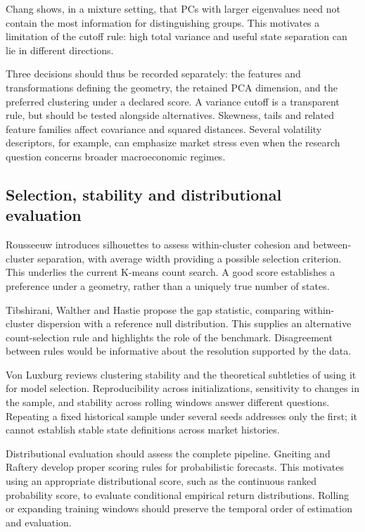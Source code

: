 \documentclass[11pt,a4paper]{article}
\begin{document}
Chang \cite{chang1983} shows, in a mixture setting, that PCs with larger eigenvalues need not contain the most information for distinguishing groups. This motivates a limitation of the cutoff rule: high total variance and useful state separation can lie in different directions.

Three decisions should thus be recorded separately: the features and transformations defining the geometry, the retained PCA dimension, and the preferred clustering under a declared score. A variance cutoff is a transparent rule, but should be tested alongside alternatives. Skewness, tails and related feature families affect covariance and squared distances. Several volatility descriptors, for example, can emphasize market stress even when the research question concerns broader macroeconomic regimes.

\subsection{Selection, stability and distributional evaluation}

Rousseeuw \cite{rousseeuw1987} introduces silhouettes to assess within-cluster cohesion and between-cluster separation, with average width providing a possible selection criterion. This underlies the current K-means count search. A good score establishes a preference under a geometry, rather than a uniquely true number of states.

Tibshirani, Walther and Hastie \cite{tibshirani2001} propose the gap statistic, comparing within-cluster dispersion with a reference null distribution. This supplies an alternative count-selection rule and highlights the role of the benchmark. Disagreement between rules would be informative about the resolution supported by the data.

Von Luxburg \cite{luxburg2010} reviews clustering stability and the theoretical subtleties of using it for model selection. Reproducibility across initializations, sensitivity to changes in the sample, and stability across rolling windows answer different questions. Repeating a fixed historical sample under several seeds addresses only the first; it cannot establish stable state definitions across market histories.

Distributional evaluation should assess the complete pipeline. Gneiting and Raftery \cite{gneitingraftery2007} develop proper scoring rules for probabilistic forecasts. This motivates using an appropriate distributional score, such as the continuous ranked probability score, to evaluate conditional empirical return distributions. Rolling or expanding training windows should preserve the temporal order of estimation and evaluation.
\end{document}
